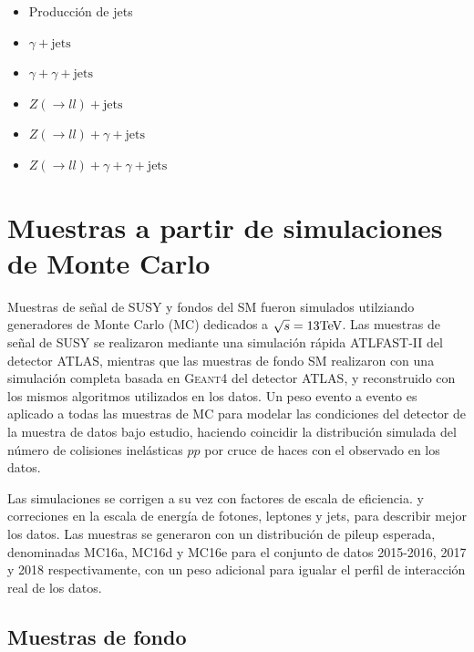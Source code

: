 \begin{itemize}
	\item Producción de jets
	\item $\gamma + \text{jets}$
  \item $\gamma + \gamma + \text{jets}$
	\item $Z(\rightarrow ll) + \text{jets}$
  \item $Z(\rightarrow ll) + \gamma + \text{jets}$
  \item $Z(\rightarrow ll) + \gamma + \gamma + \text{jets}$
\end{itemize}


\section{Muestras a partir de simulaciones de Monte Carlo}

Muestras de señal de SUSY y fondos del SM fueron simulados
utilziando generadores de Monte Carlo (MC) dedicados a $\sqrt{s} = 13 \text{TeV}$.
Las muestras de señal de SUSY se realizaron mediante una simulación rápida \textsc{ATLFAST-II} \cite{Richter-Was:683751} del detector ATLAS, mientras que las muestras de fondo SM realizaron con una simulación completa basada en \textsc{Geant4}\cite{Geant4} del detector ATLAS, y reconstruido con los mismos
algoritmos utilizados en los datos. Un peso evento a evento es aplicado
a todas las muestras de MC para modelar las condiciones del detector de la muestra de datos bajo estudio,
haciendo coincidir la distribución simulada del número de colisiones inelásticas $pp$ por cruce de haces con el observado en los datos.

Las simulaciones se corrigen a su vez con factores de escala de eficiencia.
y correciones en la escala de energía de fotones, leptones y
jets, para describir mejor los datos. Las muestras se generaron con un
distribución de pileup esperada, denominadas MC16a, MC16d y MC16e para el conjunto de datos 2015-2016, 2017 y
2018 respectivamente, con un peso adicional para igualar
el perfil de interacción real de los datos. 


\subsection{Muestras de fondo}

